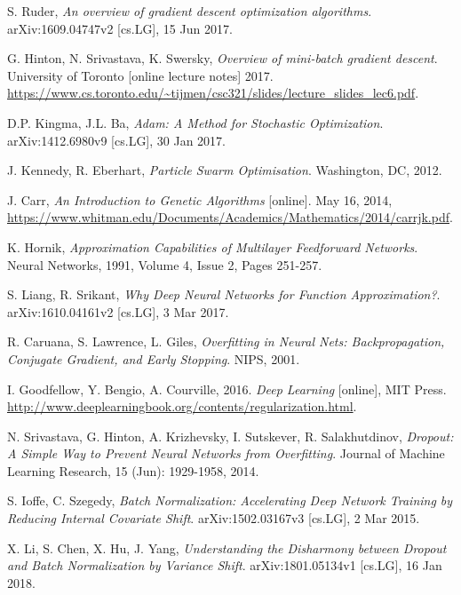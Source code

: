\documentclass[../main.tex]{subfiles}
\begin{document}
\begin{thebibliography}{999}

  S. Ruder,
  \emph{An overview of gradient descent optimization algorithms}.
  arXiv:1609.04747v2 [cs.LG],
  15 Jun 2017.

  G. Hinton, N. Srivastava, K. Swersky,
  \emph{Overview of mini-batch gradient descent}.
  University of Toronto
  [online lecture notes]
  2017.
  \url{https://www.cs.toronto.edu/~tijmen/csc321/slides/lecture_slides_lec6.pdf}.

  D.P. Kingma, J.L. Ba,
  \emph{Adam: A Method for Stochastic Optimization}.
  arXiv:1412.6980v9 [cs.LG],
  30 Jan 2017.

  J. Kennedy, R. Eberhart,
  \emph{Particle Swarm Optimisation}.
  Washington, DC,
  2012.

  J. Carr,
  \emph{An Introduction to Genetic Algorithms}
  [online].
  May 16, 2014,
  \url{https://www.whitman.edu/Documents/Academics/Mathematics/2014/carrjk.pdf}.

  K. Hornik,
  \emph{Approximation Capabilities of Multilayer Feedforward Networks}.
  Neural Networks,
  1991,
  Volume 4,
  Issue 2,
  Pages 251-257.

  S. Liang, R. Srikant,
  \emph{Why Deep Neural Networks for Function Approximation?}.
  arXiv:1610.04161v2 [cs.LG],
  3 Mar 2017.

  R. Caruana, S. Lawrence, L. Giles,
  \emph{Overfitting in Neural Nets: Backpropagation, Conjugate Gradient, and Early Stopping}.
  NIPS,
  2001.

  I. Goodfellow, Y. Bengio, A. Courville,
  2016.
  \emph{Deep Learning}
  [online],
  MIT Press.
  \url{http://www.deeplearningbook.org/contents/regularization.html}.

  N. Srivastava, G. Hinton, A. Krizhevsky, I. Sutskever, R. Salakhutdinov,
  \emph{Dropout: A Simple Way to Prevent Neural Networks from Overfitting}.
  Journal of Machine Learning Research, 
  15 (Jun): 1929-1958, 2014.

  S. Ioffe, C. Szegedy,
  \emph{Batch Normalization: Accelerating Deep Network Training by Reducing Internal Covariate Shift}.
  arXiv:1502.03167v3 [cs.LG],
  2 Mar 2015.

X. Li, S. Chen, X. Hu, J. Yang,
\emph{Understanding the Disharmony between Dropout and Batch Normalization by Variance Shift}.
arXiv:1801.05134v1 [cs.LG],
16 Jan 2018.


\end{thebibliography}
\end{document}
